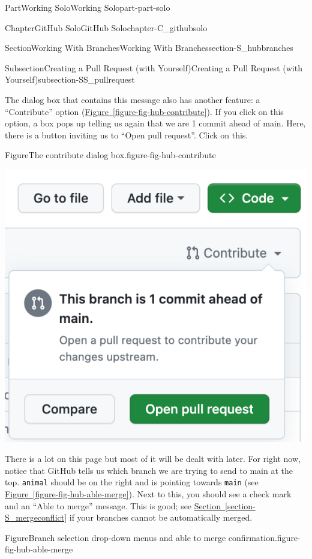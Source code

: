 \documentclass[oneside,10pt,]{book}
\newcommand{\xreffont}{\relax}
\newcommand{\mono}[1]{\texttt{#1}}
\begin{document}
\begin{partptx}{Part}{Working Solo}{}{Working Solo}{}{}{part-part-solo}
\begin{chapterptx}{Chapter}{GitHub Solo}{}{GitHub Solo}{}{}{chapter-C_githubsolo}
\begin{sectionptx}{Section}{Working With Branches}{}{Working With Branches}{}{}{section-S_hubbranches}
\begin{subsectionptx}{Subsection}{Creating a Pull Request (with Yourself)}{}{Creating a Pull Request (with Yourself)}{}{}{subsection-SS_pullrequest}
\par
The dialog box that contains this message also has another feature: a ``Contribute'' option (\hyperref[figure-fig-hub-contribute]{Figure~{\xreffont\ref{figure-fig-hub-contribute}}}). If you click on this option, a box pops up telling us again that we are 1 commit ahead of main. Here, there is a button inviting us to ``Open pull request''. Click on this.%
\begin{figureptx}{Figure}{The contribute dialog box.}{figure-fig-hub-contribute}{}%
\begin{image}{0.25}{0.5}{0.25}{}%
\includegraphics[width=\linewidth]{external/hub_contribute.pdf}
\end{image}%
\tcblower
\end{figureptx}%
There is a lot on this page but most of it will be dealt with later. For right now, notice that GitHub tells us which branch we are trying to send to main at the top. \mono{animal} should be on the right and is pointing towards \mono{main} (see \hyperref[figure-fig-hub-able-merge]{Figure~{\xreffont\ref{figure-fig-hub-able-merge}}}). Next to this, you should see a check mark and an ``Able to merge'' message. This is good; see \hyperref[section-S_mergeconflict]{Section~{\xreffont\ref{section-S_mergeconflict}}} if your branches cannot be automatically merged.%
\begin{figureptx}{Figure}{Branch selection drop-down menus and able to merge confirmation.}{figure-fig-hub-able-merge}{}%

\end{figureptx}
\end{subsectionptx}
\end{sectionptx}
\end{chapterptx}
\end{partptx}
\end{document}
